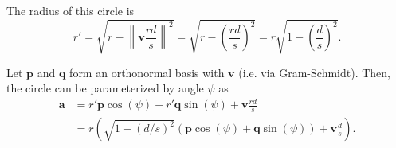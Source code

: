 The radius of this circle is
$$ r' = \sqrt{r - \left\| \bm{v}\frac{rd}{s} \right\|^2} = \sqrt{r - \left(\frac{rd}{s}\right)^2} = r\sqrt{1 - \left(\frac{d}{s}\right)^2}.$$

Let $\bm{p}$ and $\bm{q}$ form an orthonormal basis with $\bm{v}$ (i.e. via Gram-Schmidt). Then, the circle can be parameterized by angle $\psi$ as
\begin{align*}
    \bm{a} &= r'\bm{p} \cos(\psi) + r'\bm{q} \sin(\psi) + \bm{v}\frac{rd}{s} \\
    &= r\left(\sqrt{1 - (d/s)^2}(\bm{p}\cos(\psi) + \bm{q}\sin(\psi)) + \bm{v}\frac{d}{s}\right).
\end{align*}

